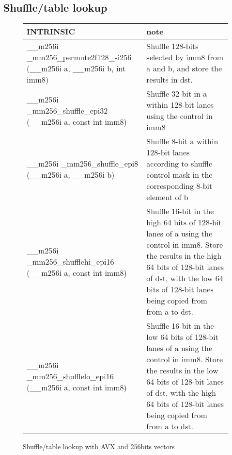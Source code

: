 \documentclass{article}
\begin{document}
\subsection{Shuffle/table lookup}
\vspace{1cm}
\begin{figure}[h!]
\noindent
\noindent\begin{tabular}{|l|l|}
  \hline
  INTRINSIC & note \\
  \hline
  \_\_m256i \_mm256\_permute2f128\_si256 (\_\_m256i a, \_\_m256i b, int imm8) &Shuffle 128-bits selected by imm8 from a and b, and store the results in dst.
 \\
  \_\_m256i \_mm256\_shuffle\_epi32 (\_\_m256i a, const int imm8) & Shuffle 32-bit in a within 128-bit lanes using the control in imm8 \\
    \hline
 \_\_m256i \_mm256\_shuffle\_epi8 (\_\_m256i a, \_\_m256i b) & Shuffle 8-bit a within 128-bit lanes according to shuffle control mask in the corresponding 8-bit element of b\\
 \hline   
 \_\_m256i \_mm256\_shufflehi\_epi16 (\_\_m256i a, const int imm8) & 
Shuffle 16-bit in the high 64 bits of 128-bit lanes of a using the control in imm8. Store the results in the high 64 bits of 128-bit lanes of dst, with the low 64 bits of 128-bit lanes being copied from from a to dst.
\\
\hline
\_\_m256i \_mm256\_shufflelo\_epi16 (\_\_m256i a, const int imm8) & 
Shuffle 16-bit in the low 64 bits of 128-bit lanes of a using the control in imm8. Store the results in the low 64 bits of 128-bit lanes of dst, with the high 64 bits of 128-bit lanes being copied from from a to dst.
\\
\hline
\end{tabular}
\caption{Shuffle/table lookup with AVX and 256bits vectors}
\label{fig:Shuffle/table lookup AVX2 256bits instructions}
\end{figure}
\end{document}
